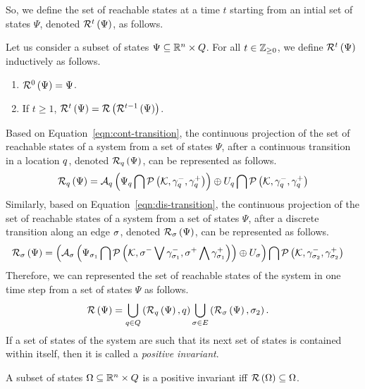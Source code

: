 %
So, we define the set of reachable states at a time $t$ starting from an intial
set of states $\Psi$, denoted $\mathcal{R}^{t}\left(\Psi\right)$, as
follows.
%
\begin{definition}
Let us consider a subset of states
$\Psi\subseteq\mathbb{R}^n\times Q$.  For all $t\in\mathbb{Z}_{\geq
0}$, we define $\mathcal{R}^{t}\left(\Psi\right)$ inductively as follows.
%
\begin{enumerate}
\item $\mathcal{R}^{0}\left(\Psi\right)=\Psi$.
\item If $t\geq 1$, $\mathcal{R}^{t}\left(\Psi\right)=\mathcal{R}\left(\mathcal{R}^{t-1}\left(\Psi\right)\right)$.
\end{enumerate}
%
\end{definition}
%
Based on Equation~\ref{eqn:cont-transition}, the continuous projection
of the set of reachable states of a system from a set of
states $\Psi$, after a continuous transition in a location $q$,
denoted $\mathcal{R}_{q}\left(\Psi\right)$, can be represented as follows.
%
\begin{align*}
&
\mathcal{R}_{q}\left(\Psi\right)=\mathcal{A}_q\left(\Psi_q\bigcap{\mathcal{P}\left(\mathcal{K},\gamma_q^-,\gamma_q^+\right)}\right)\oplus U_q\bigcap
\mathcal{P}\left(\mathcal{K},\gamma_q^-,\gamma_q^+\right)\\
\end{align*}
%
Similarly, based on Equation~\ref{eqn:dis-transition}, the continuous
projection of the set of reachable states of a system from a set of
states $\Psi$, after a discrete transition along an edge $\sigma$,
denoted $\mathcal{R}_{\sigma}\left(\Psi\right)$, can be represented as follows.
%
\begin{align*}
&
\mathcal{R}_{\sigma}\left(\Psi\right)=\left(\mathcal{A}_\sigma\left(\Psi_{\sigma_1}\bigcap\mathcal{P}\left(\mathcal{K},\sigma^-\bigvee \gamma_{\sigma_1}^-,\sigma^+\bigwedge \gamma_{\sigma_1}^+\right)\right)\oplus U_{\sigma}\right)\bigcap 
\mathcal{P}\left(\mathcal{K},\gamma_{\sigma_2}^-,\gamma_{\sigma_2}^+\right)
\end{align*}
%
Therefore, we can represented the set of reachable states of the
system in one time step from a set of states $\Psi$ as follows.
%
\begin{align*}
& \mathcal{R}\left(\Psi\right)=\bigcup_{q\in Q}\left(\mathcal{R}_{q}\left(\Psi\right),q\right)\bigcup_{\sigma\in E}\left(\mathcal{R}_{\sigma}\left(\Psi\right),\sigma_2\right).
\end{align*}
%
If a set of states of the system are such that its next set of states
is contained within itself, then it is called a {\it positive invariant}.
%
\begin{definition}
A subset of states $\Omega\subseteq\mathbb{R}^n\times Q$ is a
positive invariant iff $\mathcal{R}\left(\Omega\right)\subseteq\Omega$.
\end{definition}
